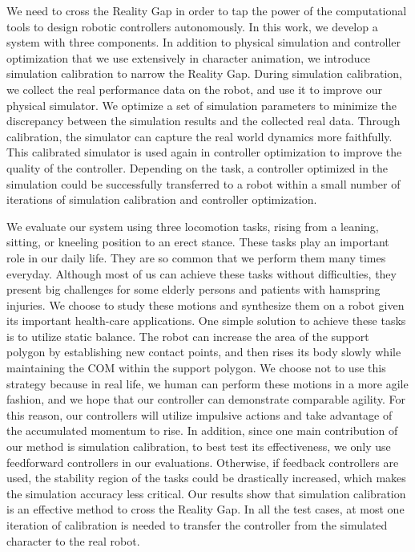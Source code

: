 We need to cross the Reality Gap in order to tap the power of the computational tools to design robotic controllers autonomously. In this work, we develop a system with three components. In addition to physical simulation and controller optimization that we use extensively in character animation, we introduce simulation calibration to narrow the Reality Gap. During simulation calibration, we collect the real performance data on the robot, and use it to improve our physical simulator. We optimize a set of simulation parameters to minimize the discrepancy between the simulation results and the collected real data. Through calibration, the simulator can capture the real world dynamics more faithfully. This calibrated simulator is used again in controller optimization to improve the quality of the controller. Depending on the task, a controller optimized in the simulation could be successfully transferred to a robot within a small number of iterations of simulation calibration and controller optimization.

We evaluate our system using three locomotion tasks, rising from a leaning, sitting, or kneeling position to an erect stance. These tasks play an important role in our daily life. They are so common that we perform them many times everyday. Although most of us can achieve these tasks without difficulties, they present big challenges for some elderly persons and patients with hamspring injuries. We choose to study these motions and synthesize them on a robot given its important health-care applications. One simple solution to achieve these tasks is to utilize static balance. The robot can increase the area of the support polygon by establishing new contact points, and then rises its body slowly while maintaining the COM within the support polygon. We choose not to use this strategy because in real life, we human can perform these motions in a more agile fashion, and we hope that our controller can demonstrate comparable agility. For this reason, our controllers will utilize impulsive actions and take advantage of the accumulated momentum to rise. In addition, since one main contribution of our method is simulation calibration, to best test its effectiveness, we only use feedforward controllers in our evaluations. Otherwise, if feedback controllers are used, the stability region of the tasks could be drastically increased, which makes the simulation accuracy less critical. Our results show that simulation calibration is an effective method to cross the Reality Gap. In all the test cases, at most one iteration of calibration is needed to transfer the controller from the simulated character to the real robot. 

